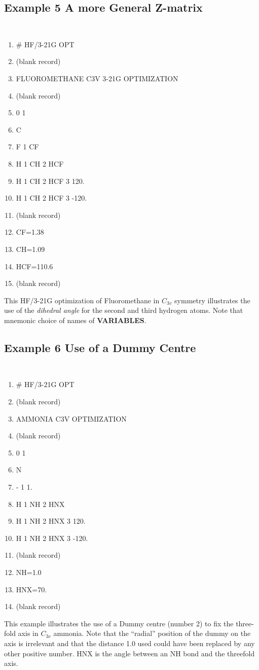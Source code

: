\subsection{\sf Example 5 A more General Z-matrix}
{\tt 
\begin{enumerate} 
\item  \# HF/3-21G OPT
\item (blank record)
\item  FLUOROMETHANE C3V 3-21G OPTIMIZATION
\item (blank record)
\item  0 1
\item  C
\item  F 1 CF
\item  H 1 CH 2 HCF
\item  H 1 CH 2 HCF 3  120.
\item  H 1 CH 2 HCF 3 -120.
\item (blank record)
\item  CF=1.38
\item  CH=1.09
\item  HCF=110.6
\item (blank record)
\end{enumerate}
}
This HF/3-21G optimization of Fluoromethane in $C_{3v}$ symmetry illustrates
the use of the {\em dihedral angle} for the second and third hydrogen atoms.
Note that mnemonic choice of names of {\bf VARIABLES}.
\newpage
\subsection{\sf Example 6 Use of a Dummy Centre}
{\tt 
\begin{enumerate}
\item  \# HF/3-21G OPT
\item (blank record)
\item  AMMONIA C3V OPTIMIZATION
\item (blank record)
\item  0 1
\item  N
\item  - 1 1.
\item  H 1 NH 2 HNX
\item  H 1 NH 2 HNX 3  120.
\item  H 1 NH 2 HNX 3 -120.
\item (blank record)
\item  NH=1.0
\item  HNX=70.
\item (blank record)
\end{enumerate}
}
This example illustrates the use of a Dummy centre (number 2) to fix the
three-fold axis in $C_{3v}$ ammonia.  Note that the ``radial''
position of the dummy on
the axis is irrelevant and that the distance 1.0 used could have been
replaced by any other positive number.  HNX is the angle between an NH
bond and the threefold axis.
\newpage
